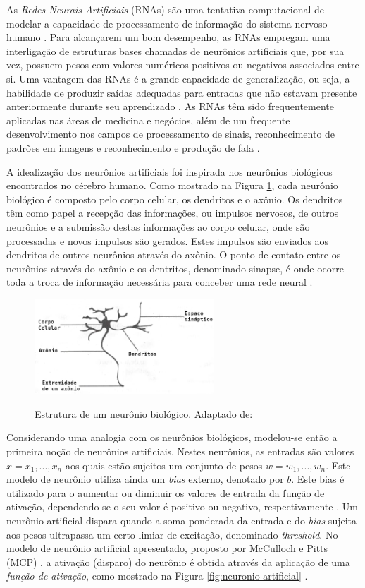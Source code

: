 
As \emph{Redes Neurais Artificiais} (RNAs) são uma tentativa computacional de modelar a capacidade de processamento de informação do sistema nervoso humano \cite{rojas}. Para alcançarem um bom desempenho, as RNAs empregam uma interligação de estruturas bases chamadas de neurônios artificiais que, por sua vez, possuem pesos com valores numéricos positivos ou negativos associados entre si. Uma vantagem das RNAs é a grande capacidade de generalização, ou seja, a habilidade de produzir saídas adequadas para entradas que não estavam presente anteriormente durante seu aprendizado \cite{haykin}. As RNAs têm sido frequentemente aplicadas nas áreas de medicina e negócios, além de um frequente desenvolvimento nos campos de processamento de sinais, reconhecimento de padrões em imagens e reconhecimento e produção de fala \cite{fausett}.

A idealização dos neurônios artificiais foi inspirada nos neurônios biológicos encontrados no cérebro humano. Como mostrado na Figura \ref{fig:neuronio}, cada neurônio biológico é composto pelo corpo celular, os dendritos e o axônio. Os dendritos têm como papel a recepção das informações, ou impulsos nervosos, de outros neurônios e a submissão destas informações ao corpo celular, onde são processadas e novos impulsos são gerados. Estes impulsos são enviados aos dendritos de outros neurônios através do axônio. O ponto de contato entre os neurônios através do axônio e os dentritos, denominado sinapse, é onde ocorre toda a troca de informação necessária para conceber uma rede neural \cite{braga}.

\begin{figure}[h!]
\centering
\caption{Estrutura de um neurônio biológico. Adaptado de: \cite{braga}}
\includegraphics[width=0.6\textwidth]{imgs/neuronio}
\label{fig:neuronio}
\end{figure}

Considerando uma analogia com os neurônios biológicos, modelou-se então a primeira noção de neurônios artificiais. Nestes neurônios, as entradas são valores $x = x_1, ..., x_n$ aos quais estão sujeitos um conjunto de pesos $w = w_1, ..., w_n$. Este modelo de neurônio utiliza ainda um \emph{bias} externo, denotado por $b$. Este bias é utilizado para o aumentar ou diminuir os valores de entrada da função de ativação, dependendo se o seu valor é positivo ou negativo, respectivamente \cite{haykin}. Um neurônio artificial dispara quando a soma ponderada da entrada e do \emph{bias} sujeita aos pesos ultrapassa um certo limiar de excitação, denominado \emph{threshold}. No modelo de neurônio artificial apresentado, proposto por McCulloch e Pitts (MCP) \cite{mcculloch}, a ativação (disparo) do neurônio é obtida através da aplicação de uma \emph{função de ativação}, como mostrado na Figura \ref{fig:neuronio-artificial} \cite{braga}.

